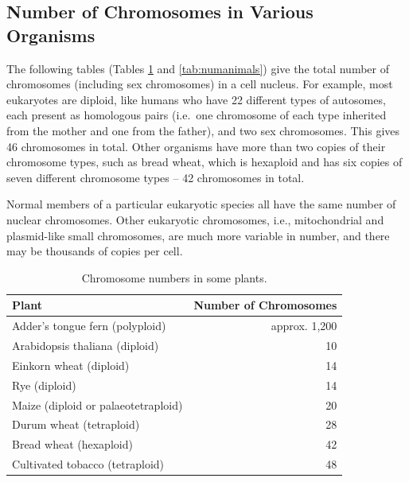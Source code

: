 \hypertarget{number-of-chromosomes-in-various-organisms}{%
\subsection{Number of Chromosomes in Various Organisms}\label{number-of-chromosomes-in-various-organisms}}

The following tables (Tables \ref{tab:numplants} and \ref{tab:numanimals}) give the total number of chromosomes (including sex chromosomes) in a cell nucleus. For example, most eukaryotes are diploid, like humans who have 22 different types of autosomes, each present as homologous pairs (i.e.~one chromosome of each type inherited from the mother and one from the father), and two sex chromosomes. This gives 46 chromosomes in total. Other organisms have more than two copies of their chromosome types, such as bread wheat, which is hexaploid and has six copies of seven different chromosome types -- 42 chromosomes in total.

Normal members of a particular eukaryotic species all have the same number of nuclear chromosomes. Other eukaryotic chromosomes, i.e., mitochondrial and plasmid-like small chromosomes, are much more variable in number, and there may be thousands of copies per cell.

\begin{table}[!h]

\caption{\label{tab:numplants}Chromosome numbers in some plants.}
\centering
\begin{tabular}[t]{lr}
\toprule
Plant & Number of Chromosomes\\
\midrule
\rowcolor{gray!6}  Adder's tongue fern (polyploid) & approx. 1,200\\
Arabidopsis thaliana (diploid) & 10\\
\rowcolor{gray!6}  Einkorn wheat (diploid) & 14\\
Rye (diploid) & 14\\
\rowcolor{gray!6}  Maize (diploid or palaeotetraploid) & 20\\
\addlinespace
Durum wheat (tetraploid) & 28\\
\rowcolor{gray!6}  Bread wheat (hexaploid) & 42\\
Cultivated tobacco (tetraploid) & 48\\
\bottomrule
\end{tabular}
\end{table}


